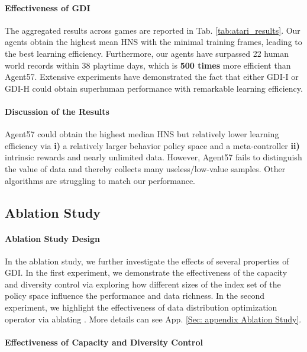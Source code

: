 \documentclass[nohyperref]{article}
\theoremstyle{plain}
\begin{document}
\paragraph{Effectiveness of GDI} The aggregated results across games are reported in Tab. \ref{tab:atari_results}. Our agents obtain the highest mean HNS with the minimal training frames, leading to the best learning efficiency. Furthermore, our agents have surpassed 22 human world records within  38 playtime days, which is \textbf{500 times} more efficient than Agent57. Extensive experiments have demonstrated the fact that either GDI-I or GDI-H could obtain  superhuman performance with remarkable learning efficiency. 


\paragraph{Discussion of the Results} Agent57 could obtain the highest median HNS but relatively lower learning efficiency via \textbf{i)} a relatively larger behavior policy space and  a meta-controller \textbf{ii)} intrinsic rewards and nearly unlimited data. However, Agent57 fails to distinguish the value of data and thereby collects many useless/low-value samples.  Other algorithms are struggling to match our performance.



\subsection{Ablation Study}


\paragraph{Ablation Study Design} In the ablation study, we further investigate the effects of several properties of GDI. In the first experiment, we demonstrate the effectiveness of the capacity and diversity control via exploring how different sizes  of the index set of the policy space influence the performance and data richness. In the second experiment, we highlight the effectiveness of data distribution optimization operator  via ablating . More details can see App. \ref{Sec: appendix Ablation Study}.
 

\paragraph{Effectiveness of Capacity and Diversity Control}
\end{document}
